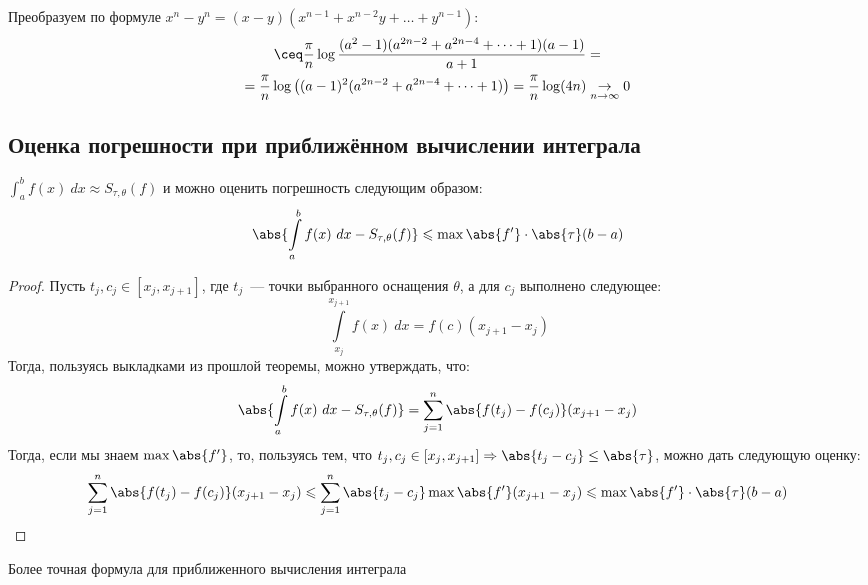 \begin{example}
\begin{enumerate}
\begin{itemize}
\[            \] 
            Преобразуем по формуле $x^n - y^n = (x - y)(x^{n - 1} + x^{n - 2}y + \dots + y^{n - 1})$:
            \[
                \begin{gathered}
                    \ceq \frac{\pi}{n}\log\frac{(a^2-1)(a^{2n - 2}+a^{2n - 4} + \dots + 1)(a-1)}{a+1}=\\=
                    \frac{\pi}{n}\log\left((a-1)^2(a^{2n - 2}+a^{2n - 4} + \dots + 1)\right) = \frac{\pi}{n}\log(4n)
                    \underset{n\to\infty}{\to} 0
                \end{gathered}
            \] 
    \end{itemize}
    \end{enumerate}
    
\end{example}


\subsection{Оценка погрешности при приближённом вычислении интеграла}
\begin{remark}
    $\int_a^b f(x)\ dx \approx S_{\tau, \theta}(f)$
    и можно оценить погрешность следующим образом:
     \[
        \abs{\int\limits_{a}^{b}{f(x)\ dx} - S_{\tau, \theta}(f)} \leqslant \max{\abs{f'}} \cdot \abs{\tau} (b - a) 
    \] 
\end{remark}
\begin{proof}
    Пусть $t_j, c_j \in [x_j, x_{j + 1}]$, где $t_j$~--- точки выбранного оснащения $\theta$, а для $c_j$ выполнено следующее:
    \[
        \int\limits_{x_j}^{x_{j + 1}}{f(x)\ dx} = f(c) (x_{j + 1} - x_j)
    \]
    Тогда, пользуясь выкладками из прошлой теоремы, можно утверждать, что:
     \[
        \abs{\int\limits_{a}^{b}{f(x)\ dx} - S_{\tau, \theta}(f)} =
        \sum\limits_{j = 1}^{n} \abs{f(t_j) - f(c_j)}(x_{j + 1} - x_j) 
    \] 
    Тогда, если мы знаем $\max{\abs{f'}}$, то, пользуясь тем, что $t_j, c_j \in [x_j, x_{j + 1}] \Rightarrow \abs{t_j - c_j} \le \abs{\tau}$,
    можно дать следующую оценку:
    \[
        \begin{gathered}
            \sum\limits_{j = 1}^{n} \abs{f(t_j) - f(c_j)}(x_{j + 1} - x_j) \leqslant 
            \sum\limits_{j = 1}^{n} \abs{t_j - c_j} \max{\abs{f'}}(x_{j + 1} - x_j) \leqslant 
            \max{\abs{f'}} \cdot \abs{\tau} (b - a) 
        \end{gathered}
    \]
\end{proof} 
\quad 

\begin{remark}
    Более точная формула для приближенного вычисления интеграла
\end{remark}



